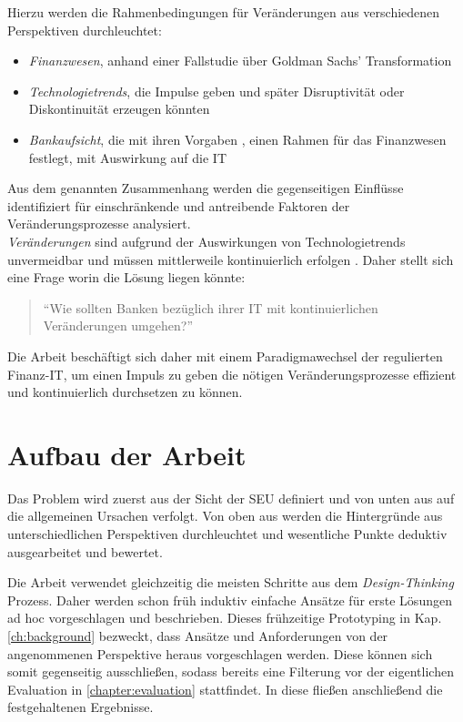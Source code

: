 Hierzu werden die Rahmenbedingungen für Veränderungen aus verschiedenen Perspektiven durchleuchtet:
\begin{itemize}
    \item \emph{Finanzwesen}, anhand einer Fallstudie \cite{Gupta:2017} über Goldman Sachs' Transformation
    \item \emph{Technologietrends}, die Impulse geben und später Disruptivität oder Diskontinuität \cite{Fernandez:2020} erzeugen könnten
    \item \emph{Bankaufsicht}, die mit ihren Vorgaben \cite{MaRisk:2017}, \cite{BAIT:2018} einen Rahmen für das Finanzwesen festlegt, mit Auswirkung auf die IT
\end{itemize}
Aus dem genannten Zusammenhang werden die gegenseitigen Einflüsse identifiziert für einschränkende und antreibende Faktoren der Veränderungsprozesse analysiert. 
\medskip
\\
\emph{Veränderungen} sind aufgrund der Auswirkungen von Technologietrends unvermeidbar und müssen mittlerweile kontinuierlich erfolgen \cite{Bussmann2006, Alt2017, Fernandez:2020}. Daher stellt sich eine Frage worin die Lösung liegen könnte: 
\begin{quote}
    \enquote{Wie sollten Banken bezüglich ihrer IT mit kontinuierlichen Veränderungen umgehen?}
\end{quote}
Die Arbeit beschäftigt sich daher mit einem Paradigmawechsel der regulierten Finanz-IT, um einen Impuls zu geben die nötigen Veränderungsprozesse effizient und kontinuierlich durchsetzen zu können.


%
%
\section{Aufbau der Arbeit}
\label{sec:intro:structure}
Das Problem wird zuerst aus der Sicht der \ac{SEU} definiert und von unten aus auf die allgemeinen Ursachen verfolgt. Von oben aus werden die Hintergründe aus unterschiedlichen Perspektiven durchleuchtet und wesentliche Punkte deduktiv ausgearbeitet und bewertet.

Die Arbeit verwendet gleichzeitig die meisten Schritte aus dem \emph{Design-Thinking} Prozess. Daher werden schon früh induktiv einfache Ansätze für erste Lösungen ad hoc vorgeschlagen und beschrieben. Dieses frühzeitige Prototyping in Kap. \ref{ch:background} bezweckt, dass Ansätze und Anforderungen von der angenommenen Perspektive heraus vorgeschlagen werden. Diese können sich somit gegenseitig ausschließen, sodass bereits eine Filterung vor der eigentlichen Evaluation in \ref{chapter:evaluation} stattfindet. In diese fließen anschließend die festgehaltenen Ergebnisse.

